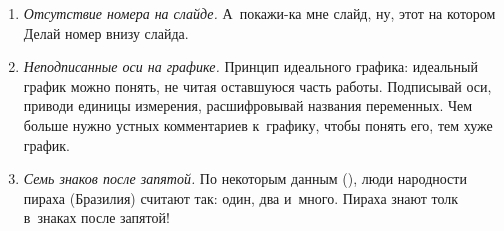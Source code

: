 \documentclass[final,pdftex]{../../template/epsilonj}
\begin{document}
\begin{enumerate}
\begin{enumerate}
		\item \textit{Отсутствие номера на слайде.} А~покажи-ка мне слайд, ну, этот\ldotst{} на котором\ldotst{} Делай номер внизу слайда.
		\item \textit{Неподписанные оси на графике.} Принцип идеального графика: идеальный график можно понять, не читая оставшуюся часть работы. Подписывай оси, приводи единицы измерения, расшифровывай названия переменных. Чем больше нужно устных комментариев к~графику, чтобы понять его, тем хуже график.
		\item \textit{Семь знаков после запятой.} По некоторым данным (\cite{piraha2008}), люди народности пираха (Бразилия) считают так: один, два и~много. Пираха знают толк в~знаках после запятой!
	\end{enumerate}
\end{enumerate}

\printbibliography
\end{document}
